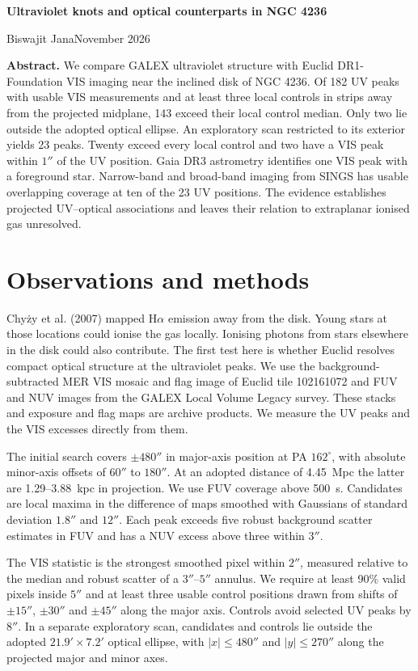\documentclass[10pt,a4paper]{article}
\begin{document}
{\LARGE\bfseries Ultraviolet knots and optical counterparts in NGC 4236\par}
\vspace{5pt}
{\large Biswajit Jana}\hfill November 2026

\textbf{Abstract.} We compare GALEX ultraviolet structure with Euclid DR1-Foundation VIS imaging near the inclined disk of NGC 4236. Of 182 UV peaks with usable VIS measurements and at least three local controls in strips away from the projected midplane, 143 exceed their local control median. Only two lie outside the adopted optical ellipse. An exploratory scan restricted to its exterior yields 23 peaks. Twenty exceed every local control and two have a VIS peak within $1''$ of the UV position. Gaia DR3 astrometry identifies one VIS peak with a foreground star. Narrow-band and broad-band imaging from SINGS has usable overlapping coverage at ten of the 23 UV positions. The evidence establishes projected UV--optical associations and leaves their relation to extraplanar ionised gas unresolved.

\section{Observations and methods}
Chy\.{z}y et al. (2007) mapped H$\alpha$ emission away from the disk. Young stars at those locations could ionise the gas locally. Ionising photons from stars elsewhere in the disk could also contribute. The first test here is whether Euclid resolves compact optical structure at the ultraviolet peaks. We use the background-subtracted MER VIS mosaic and flag image of Euclid tile 102161072 and FUV and NUV images from the GALEX Local Volume Legacy survey. These stacks and exposure and flag maps are archive products. We measure the UV peaks and the VIS excesses directly from them.

The initial search covers $\pm480''$ in major-axis position at PA $162^{\circ}$, with absolute minor-axis offsets of $60''$ to $180''$. At an adopted distance of 4.45~Mpc the latter are 1.29--3.88~kpc in projection. We use FUV coverage above 500~s. Candidates are local maxima in the difference of maps smoothed with Gaussians of standard deviation $1.8''$ and $12''$. Each peak exceeds five robust background scatter estimates in FUV and has a NUV excess above three within $3''$.

The VIS statistic is the strongest smoothed pixel within $2''$, measured relative to the median and robust scatter of a $3''$--$5''$ annulus. We require at least 90\% valid pixels inside $5''$ and at least three usable control positions drawn from shifts of $\pm15''$, $\pm30''$ and $\pm45''$ along the major axis. Controls avoid selected UV peaks by $8''$. In a separate exploratory scan, candidates and controls lie outside the adopted $21.9'\times7.2'$ optical ellipse, with $|x|\le480''$ and $|y|\le270''$ along the projected major and minor axes.
\end{document}

